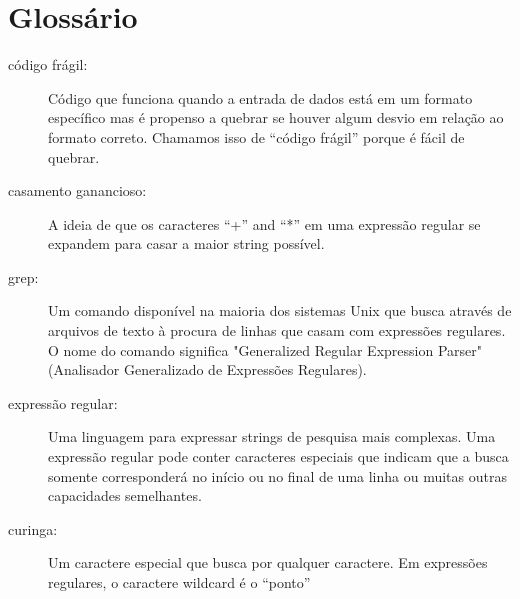 \section{Glossário}

\begin{description}

\item[código frágil:]
Código que funciona quando a entrada de dados está em um formato específico
mas é propenso a quebrar se houver algum desvio em relação ao formato
correto. Chamamos isso de ``código frágil'' porque é fácil de quebrar.

\item[casamento ganancioso:]
A ideia de que os caracteres ``+'' and ``*'' em uma expressão regular se
expandem para casar a maior string possível.

\item[grep:]
Um comando disponível na maioria dos sistemas Unix que busca através de
arquivos de texto à procura de linhas que casam com expressões regulares. O
nome do comando significa "Generalized Regular Expression Parser" (Analisador
Generalizado de Expressões Regulares).

\item[expressão regular:]
Uma linguagem para expressar strings de pesquisa mais complexas. Uma
expressão regular pode conter caracteres especiais que indicam que a busca
somente corresponderá no início ou no final de uma linha ou muitas outras
capacidades semelhantes.

\item[curinga:]
Um caractere especial que busca por qualquer caractere. Em expressões
regulares, o caractere wildcard é o ``ponto''


\end{description}

